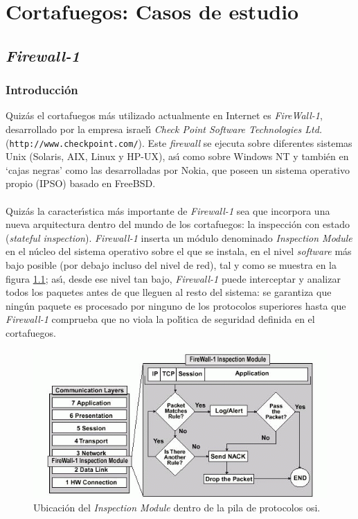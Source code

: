 \chapter{Cortafuegos: Casos de estudio}
\section{\it Firewall-1}
\subsection{Introducci\'on}
Quiz\'as el cortafuegos m\'as utilizado actualmente en Internet es {\it 
FireWall-1}, desarrollado por la empresa israel\'{\i} {\it Check Point Software 
Technologies Ltd.} ({\tt http://www.checkpoint.com/}). Este {\it firewall} se
ejecuta sobre diferentes sistemas Unix (Solaris, AIX, Linux y HP-UX), as\'{\i}
como sobre Windows NT y tambi\'en en `cajas negras' como las desarrolladas
por Nokia, que poseen un sistema operativo propio (IPSO) basado en FreeBSD.\\
\\Quiz\'as la caracter\'{\i}stica m\'as importante de {\it Firewall-1} sea que
incorpora una nueva arquitectura dentro del mundo de los cortafuegos: la 
inspecci\'on con estado ({\it stateful inspection}). {\it Firewall-1} inserta 
un m\'odulo denominado {\it Inspection Module} en el n\'ucleo del sistema 
operativo sobre el que se instala, en el nivel {\it software} m\'as bajo 
posible (por debajo incluso del nivel de red), tal y como se muestra en la 
figura \ref{fw1}; as\'{\i}, desde ese nivel tan bajo, {\it Firewall-1} puede 
interceptar y analizar todos los paquetes antes de que lleguen al resto del 
sistema: se garantiza que ning\'un paquete es procesado por ninguno de los 
protocolos superiores hasta que {\it Firewall-1} comprueba que no viola la 
pol\'{\i}tica de seguridad definida en el cortafuegos.\\
\begin{figure}
\begin{center}
\includegraphics[width=\textwidth]{fw1.png}
\caption{Ubicaci\'on del {\it Inspection Module} dentro de la pila de 
protocolos {\sc osi}.}
\label{fw1}
\end{center}
\end{figure}

